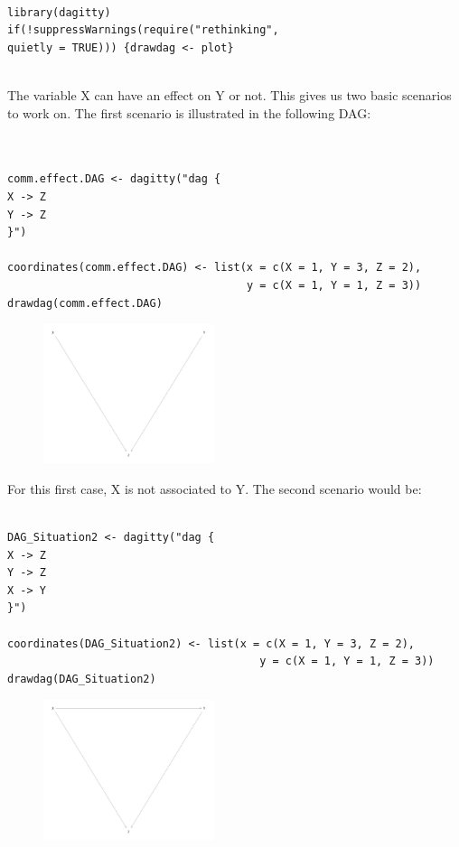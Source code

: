 \documentclass{article}
\begin{document}
\begin{lstlisting}

library(dagitty)
if(!suppressWarnings(require("rethinking", 
quietly = TRUE))) {drawdag <- plot}
  
\end{lstlisting}

The variable X can have an effect on Y or not. This gives us two basic scenarios to work on. 
The first scenario is illustrated in the following DAG:

\begin{lstlisting}


comm.effect.DAG <- dagitty("dag {
X -> Z
Y -> Z
}")

coordinates(comm.effect.DAG) <- list(x = c(X = 1, Y = 3, Z = 2),
                                     y = c(X = 1, Y = 1, Z = 3))
drawdag(comm.effect.DAG)

\end{lstlisting}

\begin{figure}[h]
\includegraphics[width=5cm]{comm.effect.DAG.png}
\centering
\end{figure}


For this first case, X is not associated to Y.
The second scenario would be:

\begin{lstlisting}

DAG_Situation2 <- dagitty("dag {
X -> Z
Y -> Z
X -> Y
}")

coordinates(DAG_Situation2) <- list(x = c(X = 1, Y = 3, Z = 2),
                                       y = c(X = 1, Y = 1, Z = 3))
drawdag(DAG_Situation2)

\end{lstlisting}

\begin{figure}[h]
\includegraphics[width=5cm]{DAG_Situation2.png}
\centering
\end{figure}
\end{document}
